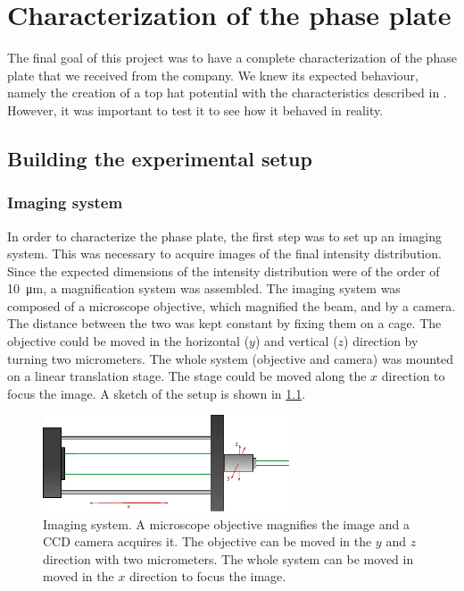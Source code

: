 \chapter{Characterization of the phase plate}
The final goal of this project was to have a complete characterization of the phase plate that we received from the company. We knew its expected behaviour, namely the creation of a top hat potential with the characteristics described in . However, it was important to test it to see how it behaved in reality.

\section{Building the experimental setup}
\subsection{Imaging system}
In order to characterize the phase plate, the first step was to set up an imaging system. This was necessary to acquire images of the final intensity distribution. Since the expected dimensions of the intensity distribution were of the order of \SI{10}{\micro\meter}, a magnification system was assembled. The imaging system was composed of a microscope objective, which magnified the beam, and by a camera. The distance between the two was kept constant by fixing them on a cage. The objective could be moved in the horizontal ($y$) and vertical ($z$) direction by turning two micrometers. The whole system (objective and camera) was mounted on a linear translation stage. The stage could be moved along the $x$ direction to focus the image. A sketch of the setup is shown in \cref{fig:imaging}.

\begin{figure}
    \centering
    \includegraphics[width=0.65\textwidth]{chapters/chapter_3/figures/imaging}
    \caption{Imaging system. A microscope objective magnifies the image and a CCD camera acquires it. The objective can be moved in the $y$ and $z$ direction with two micrometers. The whole system can be moved in moved in the $x$ direction to focus the image.}
    \label{fig:imaging}
\end{figure}

